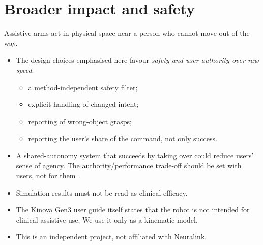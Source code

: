 \section{Broader impact and safety}
Assistive arms act in physical space near a person who cannot move out of the way.
\begin{itemize}
\item The design choices emphasised here favour \emph{safety and user authority over
  raw speed}:
  \begin{itemize}
  \item a method-independent safety filter;
  \item explicit handling of changed intent;
  \item reporting of wrong-object grasps;
  \item reporting the user's share of the command, not only success.
  \end{itemize}
\item A shared-autonomy system that succeeds by taking over could reduce users' sense of
  agency. The authority/performance trade-off should be set with users, not for them~\cite{gopinath2017human}.
\item Simulation results must not be read as clinical efficacy.
\item The Kinova Gen3 user guide itself states that the robot is not intended for
  clinical assistive use. We use it only as a kinematic model.
\item This is an independent project, not affiliated with Neuralink.
\end{itemize}
